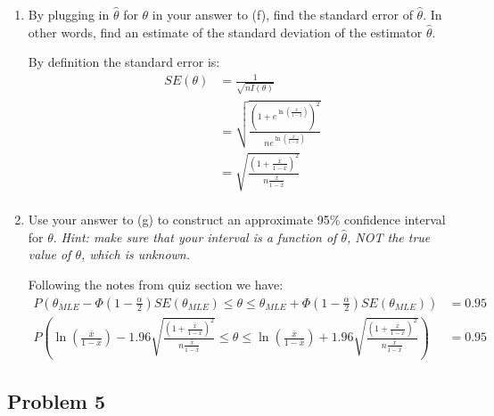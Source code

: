 \documentclass{article}
\newcommand{\1}{\mathbf{1}}
\begin{document}
\begin{enumerate}
    \newpage
    \item By plugging in $\hat{\theta}$ for $\theta$ in your answer to (f), find the standard error of $\hat{\theta}$. In other words, find an estimate of the standard deviation of the estimator $\hat{\theta}$.
    
    By definition the standard error is:
    \begin{align*}
        SE(\theta) &= \frac{1}{\sqrt{nI(\theta)}} \\
        &= \sqrt{\frac{(1+e^{ \ln{\left( \frac{\bar x}{1 - \bar x} \right)  }})^2}{ne^{ \ln{\left( \frac{\bar x}{1 - \bar x} \right)  }}}} \\
        &= \sqrt{\frac{(1 + \frac{\bar x}{1 - \bar x} )^2}{n\frac{\bar x}{1 - \bar x} }} \\
    \end{align*}
    
    \item Use your answer to (g) to construct an approximate 95\% confidence interval for $\theta$. {\it Hint: make sure that your interval is a function of $\hat{\theta}$, NOT the true value of $\theta$, which is unknown.}
    
    Following the notes from quiz section we have: 
        \begin{align*}
        P\left(\theta_{MLE} - \Phi\left(1-\frac{\alpha}{2}\right)SE(\theta_{MLE}) \leq \theta \leq \theta_{MLE} + \Phi\left(1-\frac{\alpha}{2}\right)SE(\theta_{MLE})\right) &= 0.95 \\
        P\left(  \ln{\left( \frac{\bar x}{1 - \bar x} \right)  }   - 1.96\sqrt{\frac{(1 + \frac{\bar x}{1 - \bar x} )^2}{n\frac{\bar x}{1 - \bar x} }}  \leq \theta \leq  \ln{\left( \frac{\bar x}{1 - \bar x} \right)  }  + 1.96\sqrt{\frac{(1 + \frac{\bar x}{1 - \bar x} )^2}{n\frac{\bar x}{1 - \bar x} }} \right) &= 0.95
    \end{align*} 
\end{enumerate}


\newpage
\subsection*{Problem 5}
\end{document}

